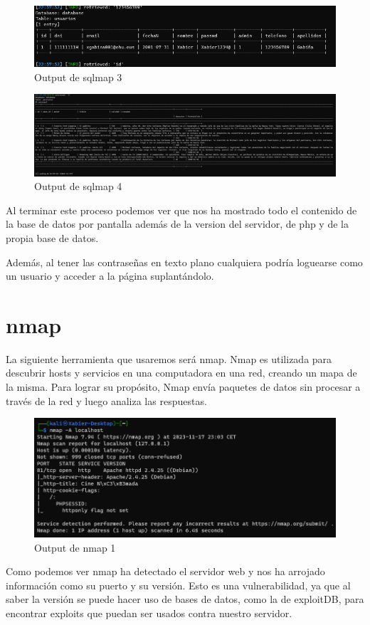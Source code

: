 \documentclass{report}
\begin{document}
            \begin{figure}[H]
                \centering
                \includegraphics[width=\textwidth]{./img/audit1/sqlmap3.png}
                \caption{Output de sqlmap 3}
            \end{figure}
            \begin{figure}[H]
                \centering
                \includegraphics[width=\textwidth]{./img/audit1/sqlmap4.png}
                \caption{Output de sqlmap 4}
            \end{figure}
            Al terminar este proceso podemos ver que nos ha mostrado todo el contenido de la base de datos por pantalla además de la version del servidor, de php y de la propia base de datos.

            Además, al tener las contraseñas en texto plano cualquiera podría loguearse como un usuario y acceder a la página suplantándolo.
        \clearpage
        \section{nmap}
            La siguiente herramienta que usaremos será nmap. Nmap es utilizada para descubrir hosts y servicios en una computadora en una red, creando un mapa de la misma. Para lograr su propósito, Nmap envía paquetes de datos sin procesar a través de la red y luego analiza las respuestas.
            \begin{figure}[H]
                \centering
                \includegraphics[width=\textwidth]{./img/audit1/nmap1.png}
                \caption{Output de nmap 1}
            \end{figure}
            Como podemos ver nmap ha detectado el servidor web y nos ha arrojado información como su puerto y su versión.
            Esto es una vulnerabilidad, ya que al saber la versión se puede hacer uso de bases de datos, como la de exploitDB, para encontrar exploits que puedan ser usados contra nuestro servidor.
        \clearpage
\end{document}
